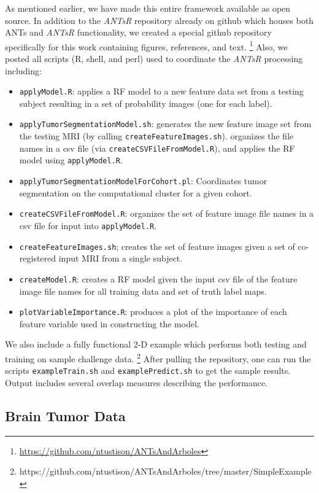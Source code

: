 \documentclass[preprint,authoryear,review,12pt]{elsarticle}
\begin{document}
{As mentioned earlier, we have made this entire framework
available as open source.  In addition to the \textit{ANTsR} repository
already on github which houses both ANTs and \textit{ANTsR} functionality, 
we created a special github repository specifically for this work
containing figures, references, and text.%
\footnote{
\href{https://github.com/ntustison/ANTsAndArboles}{https://github.com/ntustison/ANTsAndArboles}
}
Also, we posted all
scripts (R, shell, and perl) used to coordinate the \textit{ANTsR} processing 
including:
\begin{itemize}
  \item {\tt applyModel.R}:  applies a RF model to a new 
  feature data set from a testing subject resulting in a set of probability
  images (one for each label).
  \item {\tt applyTumorSegmentationModel.sh}:  generates the new feature image set 
  from the testing MRI (by calling {\tt createFeatureImages.sh}).
  organizes the file names in a csv file (via {\tt createCSVFileFromModel.R}),
  and applies the RF model using {\tt applyModel.R}. 
  \item {\tt applyTumorSegmentationModelForCohort.pl}:  Coordinates tumor 
  segmentation on the computational cluster for a given cohort.
  \item {\tt createCSVFileFromModel.R}:  organizes the set of feature image
  file names in a csv file for input into {\tt applyModel.R}.
  \item {\tt createFeatureImages.sh};  creates the set of feature images given
  a set of co-registered input MRI from a single subject. 
  \item {\tt createModel.R}:  creates a RF model given the input csv 
  file of the feature image file names for all training data and set of truth
  label maps.
  \item {\tt plotVariableImportance.R}:  produces a plot of the importance 
   of each feature variable used 
  in constructing the model.
\end{itemize}
We also include a fully functional 2-D example which performs
both testing and training on sample challenge data.%
\footnote{
https://github.com/ntustison/ANTsAndArboles/tree/master/SimpleExample
}
After pulling the repository, one can run the scripts {\tt exampleTrain.sh}
and {\tt examplePredict.sh} to get the sample results.  Output includes
several overlap measures describing the performance.

\subsection{Brain Tumor Data}

}
\end{document}
